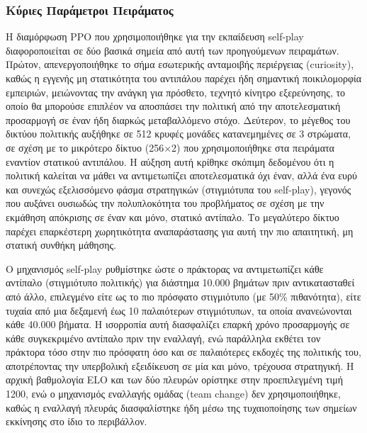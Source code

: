 \documentclass[12pt]{article}
\begin{document}
\subsubsection{Κύριες Παράμετροι Πειράματος}
Η διαμόρφωση PPO που χρησιμοποιήθηκε για την εκπαίδευση self-play διαφοροποιείται σε δύο βασικά σημεία από αυτή των προηγούμενων πειραμάτων. Πρώτον, απενεργοποιήθηκε το σήμα εσωτερικής ανταμοιβής περιέργειας (curiosity), καθώς η εγγενής μη στατικότητα του αντιπάλου παρέχει ήδη σημαντική ποικιλομορφία εμπειριών, μειώνοντας την ανάγκη για πρόσθετο, τεχνητό κίνητρο εξερεύνησης, το οποίο θα μπορούσε επιπλέον να αποσπάσει την πολιτική από την αποτελεσματική προσαρμογή σε έναν ήδη διαρκώς μεταβαλλόμενο στόχο. Δεύτερον, το μέγεθος του δικτύου πολιτικής αυξήθηκε σε 512 κρυφές μονάδες κατανεμημένες σε 3 στρώματα, σε σχέση με το μικρότερο δίκτυο (256×2) που χρησιμοποιήθηκε στα πειράματα εναντίον στατικού αντιπάλου. Η αύξηση αυτή κρίθηκε σκόπιμη δεδομένου ότι η πολιτική καλείται να μάθει να αντιμετωπίζει αποτελεσματικά όχι έναν, αλλά ένα ευρύ και συνεχώς εξελισσόμενο φάσμα στρατηγικών (στιγμιότυπα του self-play), γεγονός που αυξάνει ουσιωδώς την πολυπλοκότητα του προβλήματος σε σχέση με την εκμάθηση απόκρισης σε έναν και μόνο, στατικό αντίπαλο. Το μεγαλύτερο δίκτυο παρέχει επαρκέστερη χωρητικότητα αναπαράστασης για αυτή την πιο απαιτητική, μη στατική συνθήκη μάθησης.

Ο μηχανισμός self-play ρυθμίστηκε ώστε ο πράκτορας να αντιμετωπίζει κάθε αντίπαλο (στιγμιότυπο πολιτικής) για διάστημα 10.000 βημάτων πριν αντικατασταθεί από άλλο, επιλεγμένο είτε ως το πιο πρόσφατο στιγμιότυπο (με 50\% πιθανότητα), είτε τυχαία από μια δεξαμενή έως 10 παλαιότερων στιγμιότυπων, τα οποία ανανεώνονται κάθε 40.000 βήματα. Η ισορροπία αυτή διασφαλίζει επαρκή χρόνο προσαρμογής σε κάθε συγκεκριμένο αντίπαλο πριν την εναλλαγή, ενώ παράλληλα εκθέτει τον πράκτορα τόσο στην πιο πρόσφατη όσο και σε παλαιότερες εκδοχές της πολιτικής του, αποτρέποντας την υπερβολική εξειδίκευση σε μία και μόνο, τρέχουσα στρατηγική. Η αρχική βαθμολογία ELO και των δύο πλευρών ορίστηκε στην προεπιλεγμένη τιμή 1200, ενώ ο μηχανισμός εναλλαγής ομάδας (team change) δεν χρησιμοποιήθηκε, καθώς η εναλλαγή πλευράς διασφαλίστηκε ήδη μέσω της τυχαιοποίησης των σημείων εκκίνησης στο ίδιο το περιβάλλον.
\end{document}

